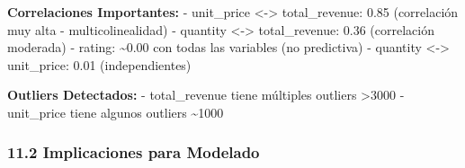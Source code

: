 \documentclass[11pt]{article}
\begin{document}
\textbf{Correlaciones Importantes:} - unit\_price
\textless-\textgreater{} total\_revenue: 0.85 (correlación muy alta -
multicolinealidad) - quantity \textless-\textgreater{} total\_revenue:
0.36 (correlación moderada) - rating: \textasciitilde0.00 con todas las
variables (no predictiva) - quantity \textless-\textgreater{}
unit\_price: 0.01 (independientes)

\textbf{Outliers Detectados:} - total\_revenue tiene múltiples outliers
\textgreater3000 - unit\_price tiene algunos outliers
\textasciitilde1000

    \subsubsection{11.2 Implicaciones para
Modelado}\label{implicaciones-para-modelado}
\end{document}

